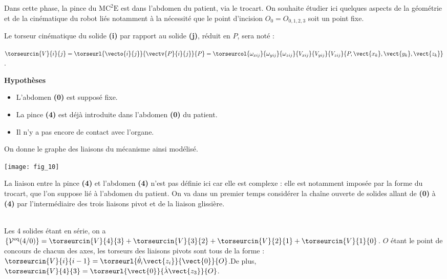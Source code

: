 \begin{multicols}{2}
\ifprof 
\else
Dans cette phase, la pince du $\text{MC}^2\text{E}$ est dans l’abdomen du patient, via le trocart. On souhaite étudier ici quelques aspects de la géométrie et de la cinématique du robot liés notamment à la nécessité que le point d’incision $O_0 =O_{0,1,2,3}$ soit un point fixe.

Le torseur cinématique du solide \textbf{(i)} par rapport au solide \textbf{(j)}, réduit en $P$, sera noté :

$\torseurcin{V}{i}{j}=\torseurl{\vecto{i}{j}}{\vectv{P}{i}{j}}{P}=\torseurcol{\omega_{xij}}{\omega_{yij}}{\omega_{zij}}{V_{xij}}{V_{yij}}{V_{zij}}{P,\vect{x_k},\vect{y_k},\vect{z_k}}$.

\textbf{Hypothèses}

\begin{itemize}
\item L’abdomen \textbf{(0)} est supposé fixe.
\item La pince \textbf{(4)} est déjà introduite dans l’abdomen \textbf{(0)} du patient.
\item Il n’y a pas encore de contact avec l’organe.
\end{itemize}

On donne le graphe des liaisons du mécanisme ainsi modélisé.

\begin{center}
\texttt{[image: fig\_10]}
\end{center}

La liaison entre la pince \textbf{(4)} et l’abdomen \textbf{(4)} n’est pas définie ici car elle est complexe : elle est notamment
imposée par la forme du trocart, que l’on suppose lié à l’abdomen du patient.
On va dans un premier temps considérer la chaîne ouverte de solides allant de \textbf{(0)} à \textbf{(4)} par l’intermédiaire des trois liaisons pivot et de la liaison glissière.
\fi

\ifprof
\begin{corrige} ~\\
Les 4 solides étant en série, on a 
$\left\{\mathcal{V}^{\text{eq}}({4}/{0})\right\}=\torseurcin{V}{4}{3}+\torseurcin{V}{3}{2}+\torseurcin{V}{2}{1}+\torseurcin{V}{1}{0}$.
$O$ étant le point de concours de chacun des axes, les torseurs des liaisons pivots sont tous de la forme : 
$\torseurcin{V}{i}{i-1}=\torseurl{\dot{\theta}_i\vect{z_i}}{\vect{0}}{O}$.De plus,  $\torseurcin{V}{4}{3}=\torseurl{\vect{0}}{\dot{\lambda}\vect{z_3}}{O}$. 


\end{corrige}
\end{multicols}
